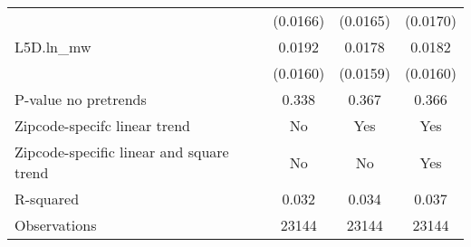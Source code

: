 {\begin{tabular}{l*{3}{c}}
          & (0.0166)         & (0.0165)         & (0.0170)         \\
[1em]
L5D.ln\_mw &   0.0192         &   0.0178         &   0.0182         \\
          & (0.0160)         & (0.0159)         & (0.0160)         \\
\hline
P-value no pretrends&    0.338         &    0.367         &    0.366         \\
Zipcode-specifc linear trend&       No         &      Yes         &      Yes         \\
Zipcode-specific linear and square trend&       No         &       No         &      Yes         \\
R-squared &    0.032         &    0.034         &    0.037         \\
Observations&    23144         &    23144         &    23144         \\
\hline\hline
\end{tabular}
}
